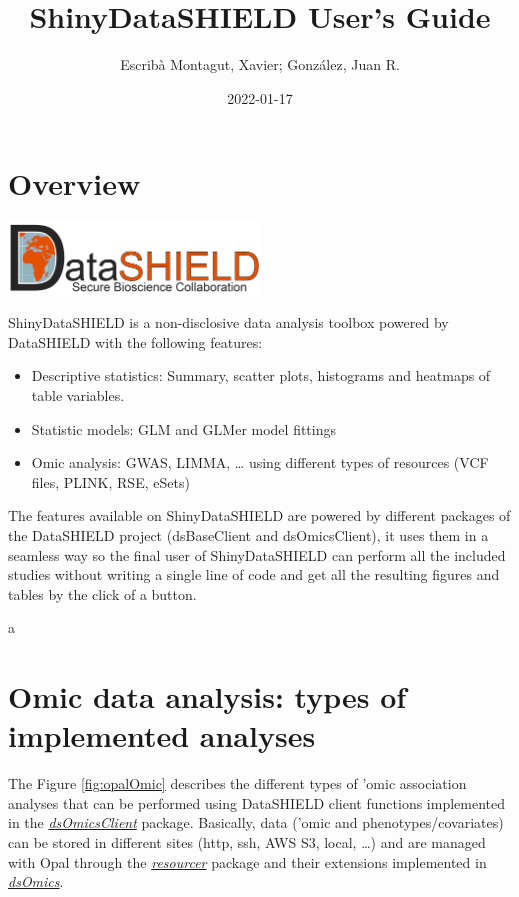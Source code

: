 \documentclass[
]{book}
\title{ShinyDataSHIELD User's Guide}
\author{Escribà Montagut, Xavier; González, Juan R.}
\date{2022-01-17}
\providecommand{\tightlist}{%
  \setlength{\itemsep}{0pt}\setlength{\parskip}{0pt}}
\begin{document}
\maketitle

{
\setcounter{tocdepth}{1}
\tableofcontents
}
\hypertarget{overview}{%
\chapter{Overview}\label{overview}}

\includegraphics[width=0.5\textwidth,height=\textheight]{fig/ds_logo.png}

ShinyDataSHIELD is a non-disclosive data analysis toolbox powered by DataSHIELD with the following features:

\begin{itemize}
\tightlist
\item
  Descriptive statistics: Summary, scatter plots, histograms and heatmaps of table variables.
\item
  Statistic models: GLM and GLMer model fittings
\item
  Omic analysis: GWAS, LIMMA, \ldots{} using different types of resources (VCF files, PLINK, RSE, eSets)
\end{itemize}

The features available on ShinyDataSHIELD are powered by different packages of the DataSHIELD project (dsBaseClient and dsOmicsClient), it uses them in a seamless way so the final user of ShinyDataSHIELD can perform all the included studies without writing a single line of code and get all the resulting figures and tables by the click of a button.

a

\hypertarget{Omic}{%
\chapter{Omic data analysis: types of implemented analyses}\label{Omic}}

The Figure \ref{fig:opalOmic} describes the different types of 'omic association analyses that can be performed using DataSHIELD client functions implemented in the \emph{\href{https://github.com/isglobal-brge/dsOmicsClient}{dsOmicsClient}} package. Basically, data ('omic and phenotypes/covariates) can be stored in different sites (http, ssh, AWS S3, local, \ldots) and are managed with Opal through the \emph{\href{https://github.com/obiba/resourcer}{resourcer}} package and their extensions implemented in \emph{\href{https://github.com/isglobal-brge/dsOmics}{dsOmics}}.
\end{document}
